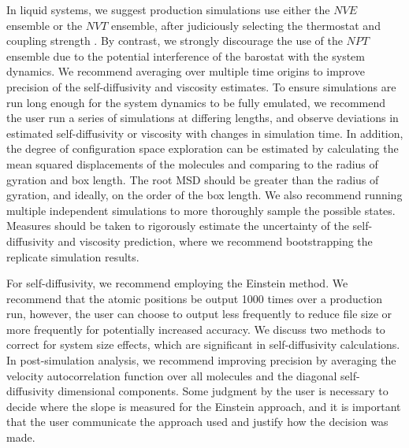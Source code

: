 \documentclass[9pt,bestpractices]{livecoms}
\begin{document}
In liquid systems, we suggest production simulations use either the $NVE$ ensemble or the $NVT$ ensemble, after judiciously selecting the thermostat and coupling strength \cite{Shirts2013,Fanourgakis2012}. By contrast, we strongly discourage the use of the $NPT$ ensemble due to the potential interference of the barostat with the system dynamics. We recommend averaging over multiple time origins to improve precision of the self-diffusivity and viscosity estimates. To ensure simulations are run long enough for the system dynamics to be fully emulated, we recommend the user run a series of simulations at differing lengths, and observe deviations in estimated self-diffusivity or viscosity with changes in simulation time. In addition, the degree of configuration space exploration can be estimated by calculating the mean squared displacements of the molecules and comparing to the radius of gyration and box length. The root MSD should be greater than the radius of gyration, and ideally, on the order of the box length. We also recommend running multiple independent simulations to more thoroughly sample the possible states. Measures should be taken to rigorously estimate the uncertainty of the self-diffusivity and viscosity prediction, where we recommend bootstrapping the replicate simulation results. 

For self-diffusivity, we recommend employing the Einstein method. We recommend that the atomic positions be output 1000 times over a production run, however, the user can choose to output less frequently to reduce file size or more frequently for potentially increased accuracy. We discuss two methods to correct for system size effects, which are significant in self-diffusivity calculations. In post-simulation analysis, we recommend improving precision by averaging the velocity autocorrelation function over all molecules and the diagonal self-diffusivity dimensional components. Some judgment by the user is necessary to decide where the slope is measured for the Einstein approach, and it is important that the user communicate the approach used and justify how the decision was made. 
\end{document}
